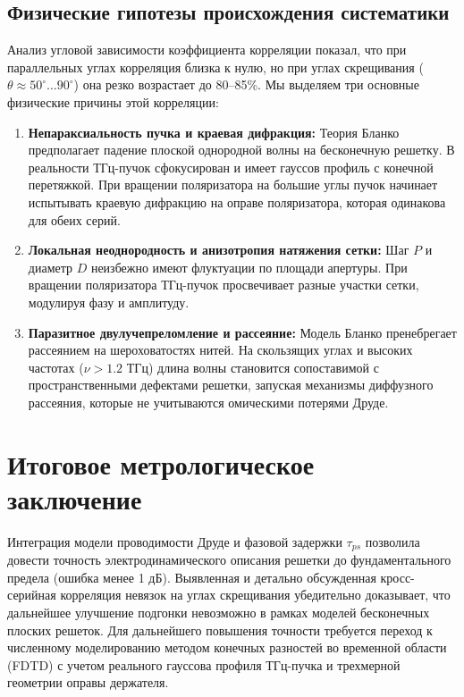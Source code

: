 \documentclass[12pt,a4paper]{article}
\begin{document}
\subsection{Физические гипотезы происхождения систематики}
Анализ угловой зависимости коэффициента корреляции показал, что при параллельных углах корреляция близка к нулю, но при углах скрещивания ($\theta \approx 50^\circ \dots 90^\circ$) она резко возрастает до 80--85\%. Мы выделяем три основные физические причины этой корреляции:
\begin{enumerate}
    \item \textbf{Непараксиальность пучка и краевая дифракция:} Теория Бланко предполагает падение плоской однородной волны на бесконечную решетку. В реальности ТГц-пучок сфокусирован и имеет гауссов профиль с конечной перетяжкой. При вращении поляризатора на большие углы пучок начинает испытывать краевую дифракцию на оправе поляризатора, которая одинакова для обеих серий.
    \item \textbf{Локальная неоднородность и анизотропия натяжения сетки:} Шаг $P$ и диаметр $D$ неизбежно имеют флуктуации по площади апертуры. При вращении поляризатора ТГц-пучок просвечивает разные участки сетки, модулируя фазу и амплитуду.
    \item \textbf{Паразитное двулучепреломление и рассеяние:} Модель Бланко пренебрегает рассеянием на шероховатостях нитей. На скользящих углах и высоких частотах ($\nu > 1.2$ ТГц) длина волны становится сопоставимой с пространственными дефектами решетки, запуская механизмы диффузного рассеяния, которые не учитываются омическими потерями Друде.
\end{enumerate}

\section{Итоговое метрологическое заключение}
Интеграция модели проводимости Друде и фазовой задержки $\tau_{ps}$ позволила довести точность электродинамического описания решетки до фундаментального предела (ошибка менее 1 дБ).
Выявленная и детально обсужденная кросс-серийная корреляция невязок на углах скрещивания убедительно доказывает, что дальнейшее улучшение подгонки невозможно в рамках моделей бесконечных плоских решеток. Для дальнейшего повышения точности требуется переход к численному моделированию методом конечных разностей во временной области (FDTD) с учетом реального гауссова профиля ТГц-пучка и трехмерной геометрии оправы держателя.
\end{document}
